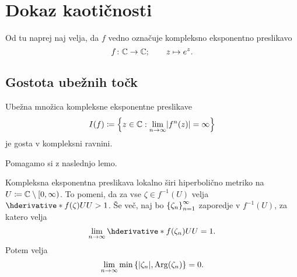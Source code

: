 \section{Dokaz kaotičnosti}

Od tu naprej naj velja, da \(f\) vedno označuje kompleksno eksponentno preslikavo
\[f \colon \mathbb C \to \mathbb C; \qquad z \mapsto e^{z}.\]

\subsection{Gostota ubežnih točk}

\begin{izrek} \label{thm:escapingdense}
    Ubežna množica kompleksne eksponentne preslikave
    \[I (f) \coloneq \set{z \in \CC : \lim_{n \to \infty} \abs{f^n (z)} = \infty}\]
    je gosta v kompleksni ravnini.
\end{izrek}

\noindent Pomagamo si z naslednjo lemo.

\begin{lema} \label{lem:hyper}
    Kompleksna eksponentna preslikava lokalno širi hiperbolično metriko na \(U \coloneq \mathbb C \setminus [0, \infty)\). To pomeni, da za vse \(\zeta \in f^{-1} (U)\) velja \(\hder{f (\zeta)}{U}{U} > 1\). Še več, naj bo \(\left\{ \zeta_n \right\}_{n = 1}^{\infty}\) zaporedje v \(f^{-1} (U)\), za katero velja \[\lim_{n \to \infty} \hder{f (\zeta_n)}{U}{U} = 1.\] Potem velja
    \[\lim_{n \to \infty} \min \left\{ |\zeta_n|, \operatorname{Arg} (\zeta_n) \right\} = 0.\]
\end{lema}

